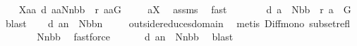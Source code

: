 \begin{isabellebody}
\ \ \isamarkupfalse%
\ {\isacharquery}X{}{\isacharequal}{\isachardoublequoteopen}{\isacharbraceleft}aa{\isachardot}\ {\isacharquery}d\ aa{\isasymsubseteq}N{\isacharminus}{\isacharbraceleft}n{\isacharbraceright}{\isacharminus}{\isacharbraceleft}{\isacharquery}bb{\isacharbraceright}\ {\isacharampersand}\ {\isasymUnion}{\isacharquery}r\ aa{\isasymsubseteq}G{\isacharbraceright}{\isachardoublequoteclose}\ \isanewline
\ \ \isamarkupfalse%
\ {\isachardoublequoteopen}a{\isasymin}{\isacharquery}X{}{\isachardoublequoteclose}\ \isamarkupfalse%
\ assms{\isacharparenleft}{}{\isacharparenright}\ \isamarkupfalse%
\ fast\ \isamarkupfalse%
\ \isamarkupfalse%
\ \isanewline
\ \ {}{\isacharcolon}\ {\isachardoublequoteopen}{\isacharquery}d\ a\ {\isasymsubseteq}\ N{\isacharminus}{\isacharbraceleft}{\isacharquery}bb{\isacharbraceright}\ {\isacharampersand}\ {\isasymUnion}{\isacharquery}r\ a\ {\isasymsubseteq}\ G{\isachardoublequoteclose}\ \isamarkupfalse%
\ blast\ \isamarkupfalse%
\ \isamarkupfalse%
\ {\isachardoublequoteopen}{\isacharquery}d\ {\isacharparenleft}a{\isacharminus}{\isacharminus}n{\isacharparenright}\ {\isasymsubseteq}\ N{\isacharminus}{\isacharbraceleft}{\isacharquery}bb{\isacharbraceright}{\isacharminus}{\isacharbraceleft}n{\isacharbraceright}{\isachardoublequoteclose}\ \isanewline
\ \ \isamarkupfalse%
\ outside{\isacharunderscore}reduces{\isacharunderscore}domain\ \isamarkupfalse%
\ {\isacharparenleft}metis\ Diff{\isacharunderscore}mono\ subset{\isacharunderscore}refl{\isacharparenright}\ \isamarkupfalse%
\ \isamarkupfalse%
\ \isanewline
\ \ {\isachardoublequoteopen}{\isachardot}{\isachardot}{\isachardot}\ {\isacharequal}\ N{\isacharminus}{\isacharbraceleft}n{\isacharbraceright}{\isacharminus}{\isacharbraceleft}{\isacharquery}bb{\isacharbraceright}{\isachardoublequoteclose}\ \isamarkupfalse%
\ fastforce\ \isamarkupfalse%
\ \isamarkupfalse%
\ \isanewline
\ \ {\isachardoublequoteopen}{\isacharquery}d\ {\isacharparenleft}a{\isacharminus}{\isacharminus}n{\isacharparenright}\ {\isasymsubseteq}\ N{\isacharminus}{\isacharbraceleft}n{\isacharbraceright}{\isacharminus}{\isacharbraceleft}{\isacharquery}bb{\isacharbraceright}{\isachardoublequoteclose}\ \isamarkupfalse%
\ blast\ \isamarkupfalse%
\ \isamarkupfalse%

\end{isabellebody}
